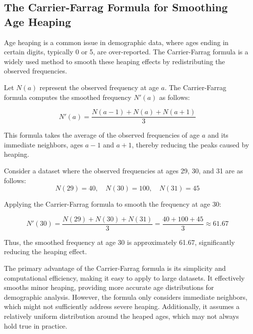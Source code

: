 \documentclass[pdflatex,sn-mathphys-num]{sn-jnl}%
\theoremstyle{thmstyleone}%
\theoremstyle{thmstyletwo}%
\theoremstyle{thmstylethree}%
\begin{document}



\subsection{The Carrier-Farrag Formula for Smoothing Age Heaping}

Age heaping is a common issue in demographic data, where ages ending in certain digits, typically 0 or 5, are over-reported. The Carrier-Farrag formula \citep{carrier1959} is a widely used method to smooth these heaping effects by redistributing the observed frequencies.

Let \( N(a) \) represent the observed frequency at age \( a \). The Carrier-Farrag formula computes the smoothed frequency \( N'(a) \) as follows:

\[
N'(a) = \frac{N(a-1) + N(a) + N(a+1)}{3}
\]

This formula takes the average of the observed frequencies of age \( a \) and its immediate neighbors, ages \( a-1 \) and \( a+1 \), thereby reducing the peaks caused by heaping.

Consider a dataset where the observed frequencies at ages 29, 30, and 31 are as follows:
\[
N(29) = 40, \quad N(30) = 100, \quad N(31) = 45
\]

Applying the Carrier-Farrag formula to smooth the frequency at age 30:

\[
N'(30) = \frac{N(29) + N(30) + N(31)}{3} = \frac{40 + 100 + 45}{3} \approx 61.67
\]

Thus, the smoothed frequency at age 30 is approximately 61.67, significantly reducing the heaping effect.



The primary advantage of the Carrier-Farrag formula is its simplicity and computational efficiency, making it easy to apply to large datasets. It effectively smooths minor heaping, providing more accurate age distributions for demographic analysis. However, the formula only considers immediate neighbors, which might not sufficiently address severe heaping. Additionally, it assumes a relatively uniform distribution around the heaped ages, which may not always hold true in practice.
\end{document}
